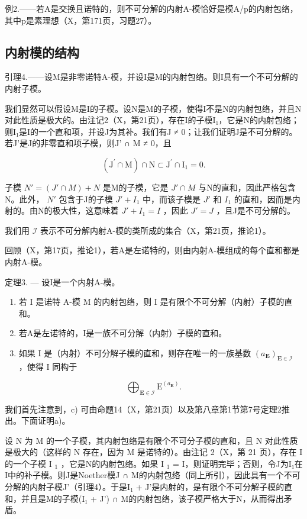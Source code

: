 例2.——若A是交换且诺特的，则不可分解的内射A-模恰好是模A/p的内射包络，其中p是素理想（X，第171页，习题27）。

\subsection{内射模的结构}

引理4.——设M是非零诺特A-模，并设I是M的内射包络。则I具有一个不可分解的内射子模。

我们显然可以假设M是I的子模。设N是M的子模，使得I不是N的内射包络，并且N对此性质是极大的。由注记2（X，第21页），存在I的子模I₁，它是N的内射包络；则I₁是I的一个直和项，并设J为其补。我们有J ≠ 0；让我们证明J是不可分解的。若J'是J的非零直和项子模，则J' ∩ M ≠ 0，且

\[
\left(\mathrm{J} ^ {\prime} \cap \mathrm{M}\right) \cap \mathrm{N} \subset \mathrm{J} ^ {\prime} \cap \mathrm{I} _ {1} = 0.
\]

子模 \(N' = (J' \cap M) + N\) 是M的子模，它是 \(J' \cap M\) 与N的直和，因此严格包含N。此外， \(N'\) 包含于J的子模 \(J' + I_{1}\) 中，而该子模是 \(J'\) 和 \(I_{1}\) 的直和，因而是内射的。由N的极大性，这意味着 \(J' + I_{1} = I\) ，因此 \(J' = J\) ，且J是不可分解的。

我们用 \(\mathcal{I}\) 表示不可分解内射A-模的类所成的集合（X，第21页，推论1）。

回顾（X，第17页，推论1），若A是左诺特的，则由内射A-模组成的每个直和都是内射A-模。

定理3. --- 设I是一个内射A-模。

\begin{enumerate}
\def\labelenumi{\alph{enumi})}
\item
  若 I 是诺特 A-模 M 的内射包络，则 I 是有限个不可分解（内射）子模的直和。
\item
  若A是左诺特的，I是一族不可分解（内射）子模的直和。
\item
  如果 I 是（内射）不可分解子模的直和，则存在唯一的一族基数 \((a_{\mathbf{E}})_{\mathbf{E}\in\mathcal{I}}\) ，使得 I 同构于
\end{enumerate}

\[
\bigoplus_ {\mathbf {E} \in \mathcal {I}} \mathrm{E} ^ {(a _ {\mathbf {E}})}.
\]

我们首先注意到，c) 可由命题14（X，第21页）以及第八章第1节第7号定理2推出。下面证明a)。

设 N 为 M 的一个子模，其内射包络是有限个不可分子模的直和，且 N 对此性质是极大的（这样的 N 存在，因为 M 是诺特的）。由注记 2（X，第 21 页），存在 I 的一个子模 I \(_{1}\) ，它是N的内射包络。如果 I \(_{1}\) = I，则证明完毕；否则，令J为I₁在I中的补子模。则J是Noether模J ∩ M的内射包络（同上所引），因此具有一个不可分解的内射子模J'（引理4）。于是I₁ + J'是内射的，是有限个不可分解子模的直和，并且是M的子模(I₁ + J') ∩ M的内射包络，该子模严格大于N，从而得出矛盾。

